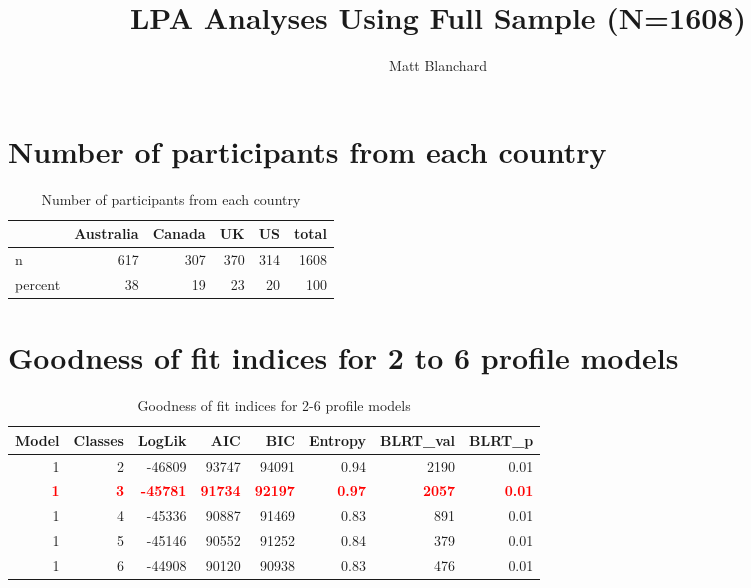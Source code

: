 \documentclass[]{article}
\title{LPA Analyses Using Full Sample (N=1608)}
\author{Matt Blanchard}
\date{}
\begin{document}
\maketitle

\hypertarget{number-of-participants-from-each-country}{%
\section{Number of participants from each
country}\label{number-of-participants-from-each-country}}

\begin{table}[H]

\caption{\label{tab:unnamed-chunk-2}Number of participants from each country}
\centering
\fontsize{6}{8}\selectfont
\begin{tabular}[t]{lrrrrr}
\toprule
  & Australia & Canada & UK & US & total\\
\midrule
n & 617 & 307 & 370 & 314 & 1608\\
percent & 38 & 19 & 23 & 20 & 100\\
\bottomrule
\end{tabular}
\end{table}

\hypertarget{goodness-of-fit-indices-for-2-to-6-profile-models}{%
\section{Goodness of fit indices for 2 to 6 profile
models}\label{goodness-of-fit-indices-for-2-to-6-profile-models}}

\begin{table}[H]

\caption{\label{tab:unnamed-chunk-3}Goodness of fit indices for 2-6 profile models}
\centering
\fontsize{6}{8}\selectfont
\begin{tabular}[t]{rrrrrrrr}
\toprule
Model & Classes & LogLik & AIC & BIC & Entropy & BLRT\_val & BLRT\_p\\
\midrule
1 & 2 & -46809 & 93747 & 94091 & 0.94 & 2190 & 0.01\\
\textcolor{red}{\textbf{1}} & \textcolor{red}{\textbf{3}} & \textcolor{red}{\textbf{-45781}} & \textcolor{red}{\textbf{91734}} & \textcolor{red}{\textbf{92197}} & \textcolor{red}{\textbf{0.97}} & \textcolor{red}{\textbf{2057}} & \textcolor{red}{\textbf{0.01}}\\
1 & 4 & -45336 & 90887 & 91469 & 0.83 & 891 & 0.01\\
1 & 5 & -45146 & 90552 & 91252 & 0.84 & 379 & 0.01\\
1 & 6 & -44908 & 90120 & 90938 & 0.83 & 476 & 0.01\\
\bottomrule
\end{tabular}
\end{table}
\end{document}
